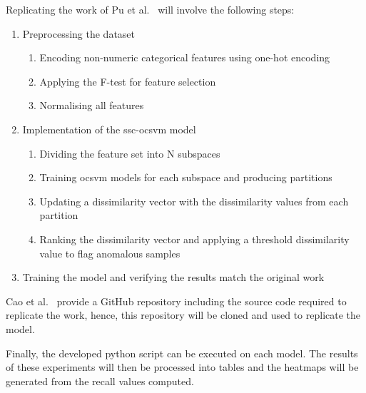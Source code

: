 Replicating the work of Pu et al.~\cite{Pu} will involve the following steps:
\begin{enumerate}
      \item Preprocessing the dataset
            \begin{enumerate}
                  \item Encoding non-numeric categorical features using one-hot encoding
                  \item Applying the F-test for feature selection
                  \item Normalising all features
            \end{enumerate}
      \item Implementation of the \gls{ssc}-\gls{ocsvm} model
      \begin{enumerate}
            \item Dividing the feature set into N subspaces
            \item Training \gls{ocsvm} models for each subspace and producing partitions
            \item Updating a dissimilarity vector with the dissimilarity values from each partition
            \item Ranking the dissimilarity vector and applying a threshold dissimilarity value to flag anomalous samples
      \end{enumerate}
      \item Training the model and verifying the results match the original work
\end{enumerate}

Cao et al.~\cite{Cao} provide a GitHub repository including the
source code required to replicate the work, hence, this repository will be
cloned and used to replicate the model.

Finally, the developed python script can be executed on each model. The
results of these experiments will then be processed into tables and the
heatmaps will be generated from the recall values computed.
